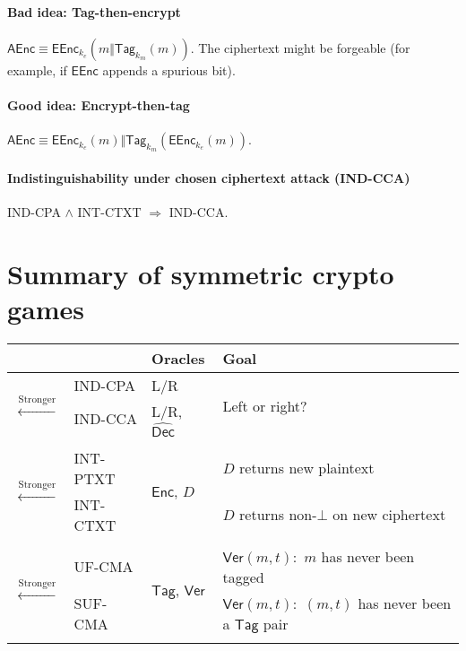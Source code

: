 \documentclass[11pt]{article}
\newcommand{\eqdef}{\ensuremath{\equiv}}
\newcommand{\AEnc}{\ensuremath{\mathsf{AEnc}}}
\newcommand{\EEnc}{\ensuremath{\mathsf{EEnc}}}
\newcommand{\Tag}{\ensuremath{\mathsf{Tag}}}
\theoremstyle{remark}
\begin{document}
\paragraph{Bad idea: Tag-then-encrypt}
$\AEnc \eqdef \EEnc_{k_e}( m \Vert \Tag_{k_m}(m) )$.
The ciphertext might be forgeable (for example,
if $\EEnc$ appends a spurious bit).

\paragraph{Good idea: Encrypt-then-tag}
$\AEnc \eqdef \EEnc_{k_e}(m) \Vert \Tag_{k_m}(\EEnc_{k_e}(m))$.

\paragraph{Indistinguishability under chosen ciphertext attack (IND-CCA)}
IND-CPA $\wedge$ INT-CTXT $\Rightarrow$ IND-CCA.

\section{Summary of symmetric crypto games}

\begin{tabular}{ll|l|l}
&& Oracles & Goal \\ \hline
\multirow{2}{*}{\begin{sideways}$\xleftarrow{\text{Stronger}}$\end{sideways}}
& IND-CPA & L/R & \multirow{2}{*}{Left or right?} \\
& IND-CCA & L/R, $\hat{\mathsf{Dec}}$ \\ & & \\ \hline
\multirow{2}{*}{\begin{sideways}$\xleftarrow{\text{Stronger}}$\end{sideways}}
& INT-PTXT & \multirow{2}{*}{$\mathsf{Enc}$, $D$} & $D$ returns new plaintext \\
& INT-CTXT & & $D$ returns non-$\bot$ on new ciphertext \\ & & \\ \hline
\multirow{2}{*}{\begin{sideways}$\xleftarrow{\text{Stronger}}$\end{sideways}}
& UF-CMA & \multirow{2}{*}{$\mathsf{Tag}$, $\mathsf{Ver}$}
& $\mathsf{Ver}(m,t) :$ $m$ has never been tagged \\
& SUF-CMA &
& $\mathsf{Ver}(m,t) :$ $(m,t)$ has never been a $\mathsf{Tag}$ pair \\ \\
\end{tabular}
\end{document}
